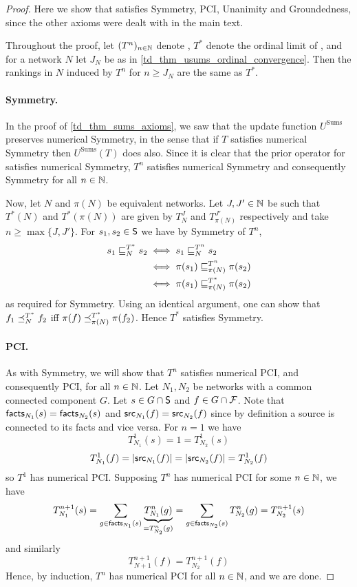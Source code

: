 \begin{proof}

Here we show that \usums{} satisfies Symmetry, PCI, Unanimity and Groundedness,
since the other axioms were dealt with in the main text.

Throughout the proof, let $(T^n)_{n \in \Nat}$ denote \usums{}, $T^*$ denote
the ordinal limit of \usums{}, and for a network $N$ let $J_N$ be as in
\cref{td_thm_usums_ordinal_convergence}. Then the rankings in $N$ induced by $T^n$
for $n \ge J_N$ are the same as $T^*$.

\paragraph{Symmetry.} In the proof of \cref{td_thm_sums_axioms}, we saw
that the update function $U^{\text{Sums}}$ preserves numerical Symmetry, in the
sense that if $T$ satisfies numerical Symmetry then $U^{\text{Sums}}(T)$ does
also. Since it is clear that the prior operator for \usums{} satisfies
numerical Symmetry, $T^n$ satisfies numerical Symmetry and consequently
Symmetry for all $n \in \Nat$.

Now, let $N$ and $\pi(N)$ be equivalent networks. Let $J, J' \in \Nat$ be
such that $T^*(N)$ and $T^*(\pi(N))$ are given by $T_N^J$ and
$T_{\pi(N)}^{J'}$ respectively and take $n \ge \max\{J, J'\}$. For $s_1, s_2
\in \S$ we have by Symmetry of $T^n$,
\begin{align*}
    s_1 \sle_N^{T^*} s_2
    & \iff s_1 \sle_N^{T^n} s_2 \\
    & \iff \pi(s_1) \sle_{\pi(N)}^{T^n} \pi(s_2) \\
    & \iff \pi(s_1) \sle_{\pi(N)}^{T^*} \pi(s_2)
\end{align*}
as required for Symmetry. Using an identical argument, one can show that $f_1
\fle_N^{T^*} f_2$ iff $\pi(f) \fle_{\pi(N)}^{T^*} \pi(f_2)$. Hence $T^*$
satisfies Symmetry.

\paragraph{PCI.}
As with Symmetry, we will show that $T^n$ satisfies numerical
PCI, and consequently PCI, for all $n \in \Nat$. Let $N_1,
N_2$ be networks with a common connected component $G$. Let $s \in G \cap \S$
and $f \in G \cap \F$. Note that $\facts_{N_1}(s) = \facts_{N_2}(s)$ and
$\src_{N_1}(f) = \src_{N_2}(f)$ since by definition a source is connected to
its facts and vice versa. For $n = 1$ we have
\[
    T_{N_1}^1(s) = 1 = T_{N_2}^1(s)
\]
\[
    T_{N_1}^1(f) = |\src_{N_1}(f)| = |\src_{N_2}(f)| = T_{N_2}^1(f)
\]
so $T^1$ has numerical PCI. Supposing $T^n$ has numerical PCI for some $n \in
\Nat$, we have
\[
    T_{N_1}^{n+1}(s)
    = \sum_{g \in \facts_{N_1}(s)}{
        \underbrace{T_{N_1}^n(g)}_{=T_{N_2}^n(g)}
    }
    = \sum_{g \in \facts_{N_2}(s)}{
        T_{N_2}^n(g)
    }
    = T_{N_2}^{n+1}(s)
\]
and similarly
\[
    T_{N+1}^{n+1}(f) = T_{N_2}^{n+1}(f)
\]
Hence, by induction, $T^n$ has numerical PCI for all $n \in \Nat$, and we are
done.


\end{proof}
